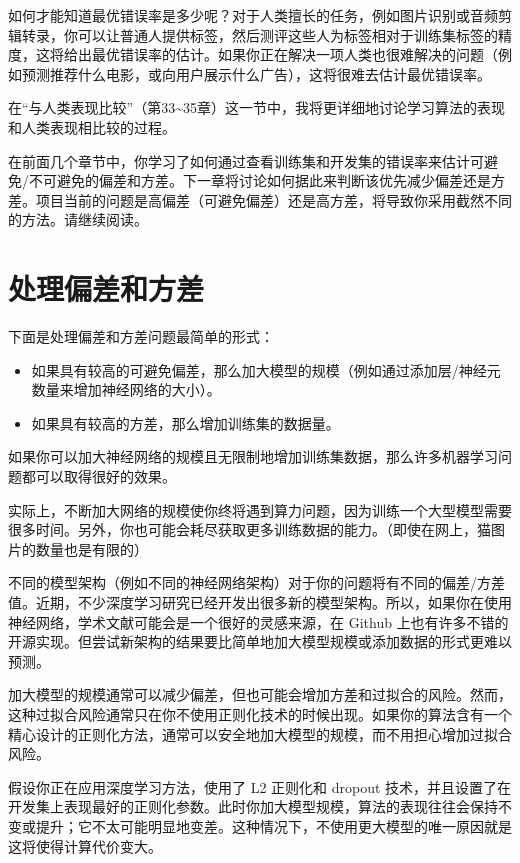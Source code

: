 如何才能知道最优错误率是多少呢？对于人类擅长的任务，例如图片识别或音频剪辑转录，你可以让普通人提供标签，然后测评这些人为标签相对于训练集标签的精度，这将给出最优错误率的估计。如果你正在解决一项人类也很难解决的问题（例如预测推荐什么电影，或向用户展示什么广告），这将很难去估计最优错误率。

在``与人类表现比较''（第33\textasciitilde35章）这一节中，我将更详细地讨论学习算法的表现和人类表现相比较的过程。

在前面几个章节中，你学习了如何通过查看训练集和开发集的错误率来估计可避免/不可避免的偏差和方差。下一章将讨论如何据此来判断该优先减少偏差还是方差。项目当前的问题是高偏差（可避免偏差）还是高方差，将导致你采用截然不同的方法。请继续阅读。

\hypertarget{ux5904ux7406ux504fux5deeux548cux65b9ux5dee}{%
\chapter{处理偏差和方差}\label{ux5904ux7406ux504fux5deeux548cux65b9ux5dee}}

下面是处理偏差和方差问题最简单的形式：

\begin{itemize}
\tightlist
\item
  如果具有较高的可避免偏差，那么加大模型的规模（例如通过添加层/神经元数量来增加神经网络的大小）。
\item
  如果具有较高的方差，那么增加训练集的数据量。
\end{itemize}

如果你可以加大神经网络的规模且无限制地增加训练集数据，那么许多机器学习问题都可以取得很好的效果。

实际上，不断加大网络的规模使你终将遇到算力问题，因为训练一个大型模型需要很多时间。另外，你也可能会耗尽获取更多训练数据的能力。（即使在网上，猫图片的数量也是有限的）

不同的模型架构（例如不同的神经网络架构）对于你的问题将有不同的偏差/方差值。近期，不少深度学习研究已经开发出很多新的模型架构。所以，如果你在使用神经网络，学术文献可能会是一个很好的灵感来源，在
Github
上也有许多不错的开源实现。但尝试新架构的结果要比简单地加大模型规模或添加数据的形式更难以预测。

加大模型的规模通常可以减少偏差，但也可能会增加方差和过拟合的风险。然而，这种过拟合风险通常只在你不使用正则化技术的时候出现。如果你的算法含有一个精心设计的正则化方法，通常可以安全地加大模型的规模，而不用担心增加过拟合风险。

假设你正在应用深度学习方法，使用了 L2 正则化和 dropout
技术，并且设置了在开发集上表现最好的正则化参数。此时你加大模型规模，算法的表现往往会保持不变或提升；它不太可能明显地变差。这种情况下，不使用更大模型的唯一原因就是这将使得计算代价变大。

